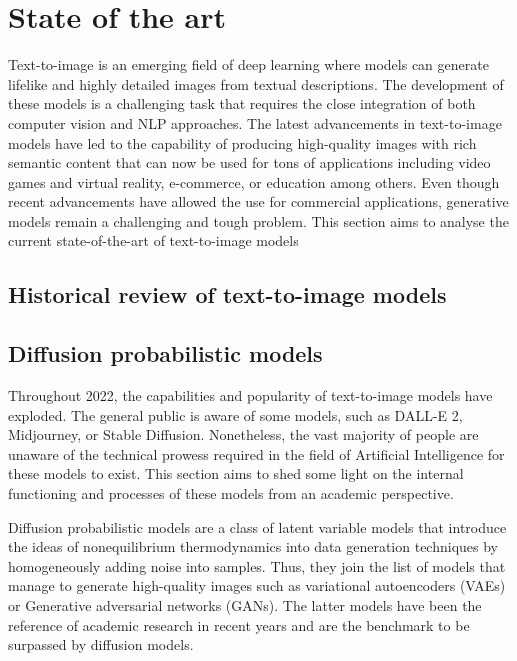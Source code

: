 \chapter{State of the art} \label{sec:colours}

Text-to-image is an emerging field of deep learning where models can generate lifelike and highly detailed images from textual descriptions.  The development of these models is a challenging task that requires the close integration of both computer vision and NLP approaches. The latest advancements in text-to-image models have led to the capability of producing high-quality images with rich semantic content that can now be used for tons of applications including video games and virtual reality, e-commerce, or education among others. Even though recent advancements have allowed the use for commercial applications, generative models remain a challenging and tough problem. This section aims to analyse the current state-of-the-art of text-to-image models

\section{Historical review of text-to-image models} \label{Hreview}

\section{Diffusion probabilistic models} \label{Dprobabilistic}

Throughout 2022, the capabilities and popularity of text-to-image models have exploded. The general public is aware of some models, such as DALL-E 2, Midjourney, or Stable Diffusion. Nonetheless, the vast majority of people are unaware of the technical prowess required in the field of Artificial Intelligence for these models to exist. This section aims to shed some light on the internal functioning and processes of these models from an academic perspective.

Diffusion probabilistic models are a class of latent variable models that introduce the ideas of nonequilibrium thermodynamics into data generation techniques by homogeneously adding noise into samples. Thus, they join the list of models that manage to generate high-quality images such as variational autoencoders (VAEs) or Generative adversarial networks (GANs). The latter models have been the reference of academic research in recent years and are the benchmark to be surpassed by diffusion models. 

